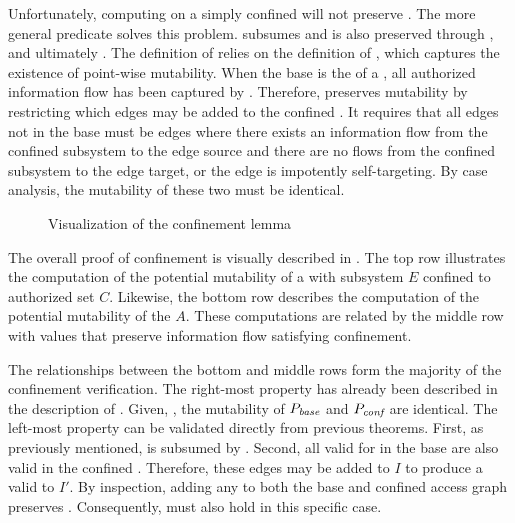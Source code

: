 Unfortunately, computing \TMpotAcc{} on a simply confined \TMaccessGraph{} will not preserve \NMagSimplyConfined{}.
The more general predicate \NMagConfined{} solves this problem.
\NMagConfined{} subsumes \NMagSimplyConfined{} and is also preserved through \TMpotTransfers{}, and ultimately \TMpotAcc{}.
The definition of \NMagConfined{} relies on the definition of \NMexFlow{}, which captures the existence of point-wise mutability.
When the base \TMaccessGraph{} is the \TMpotAccAG{} of a \TMfullAuthAG{}, all authorized information flow has been captured by \NMmutable{}.
Therefore, \NMagConfined{} preserves mutability by restricting which edges may be added to the confined \TMaccessGraph{}.
It requires that all edges not in the base \TMaccessGraph{} must be \NMwk{} edges where there exists an information flow from the confined subsystem to the edge source and there are no flows from the confined subsystem to the edge target, or the edge is impotently self-targeting.
By case analysis, the mutability of these two \TMaccessGraphs{} must be identical.

\begin{figure}[h]
\centering
    \FIGconfinementLemmaMath{}
\caption{Visualization of the confinement lemma \label{fig:sketch:confinement-lemma}}
\end{figure}

The overall proof of confinement is visually described in .
The top row illustrates the computation of the potential mutability of a \TMsystemState{} with subsystem \(E\) confined to authorized set \(C\).
Likewise, the bottom row describes the computation of the potential mutability of the \TMfullAuthAG{} \(A\).
These computations are related by the middle row with values that preserve information flow satisfying confinement.

The relationships between the bottom and middle rows form the majority of the confinement verification.
The right-most property has already been described in the description of \NMagConfined{}.
Given, , the mutability of \(P_{\textit{base}}\) and \(P_{\textit{conf}}\) are identical.
The left-most property can be validated directly from previous theorems.
First, as previously mentioned, \NMagSimplyConfined{} is subsumed by \NMagConfined{}.
Second, all \TMaccessEdges{} valid for \NMtransfer{} in the base are also valid in the confined \TMaccessGraph{}.
Therefore, these edges may be added to \(I\) to produce a valid \TMpotTransfer{} to \(I'\).
By inspection, adding any \TMaccessEdge{} to both the base and confined access graph preserves \NMagConfined{}.
Consequently, \NMagConfined{} must also hold in this specific case.

